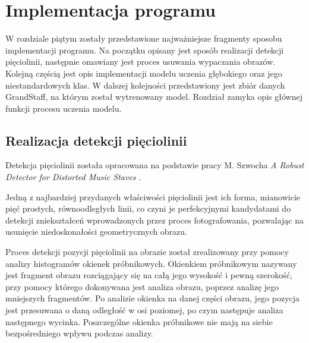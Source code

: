 \chapter{Implementacja programu}
W rozdziale piątym zostały przedstawione najważniejsze fragmenty sposobu implementacji programu. Na początku opisany jest sposób realizacji detekcji pięciolinii, następnie omawiany jest proces usuwania wypaczania obrazów. Kolejną częścią jest opis implementacji modelu uczenia głębokiego oraz jego niestandardowych klas. W dalszej kolejności przedstawiony jest zbiór danych GrandStaff, na którym został wytrenowany model. Rozdział zamyka opis głównej funkcji procesu uczenia modelu.

\section{Realizacja detekcji pięciolinii}

Detekcja pięciolinii została opracowana na podstawie pracy M. Szwocha \textit{A Robust Detector for Distorted Music Staves} \cite{Szwoch2005}.

Jedną z najbardziej przydanych właściwości pięciolinii jest ich forma, mianowicie pięć prostych, równoodległych linii, co czyni je perfekcyjnymi kandydatami do detekcji zniekształceń wprowadzonych przez proces fotografowania, pozwalając na usunięcie niedoskonałości geometrycznych obrazu.

Proces detekcji pozycji pięciolinii na obrazie został zrealizowany przy pomocy analizy histogramów okienek próbnikowych. Okienkiem próbnikowym nazywany jest fragment obrazu rozciągający się na całą jego wysokość i pewną szerokość, przy pomocy którego dokonywana jest analiza obrazu, poprzez analizę jego mniejszych fragmentów. Po analizie okienka na danej części obrazu, jego pozycja jest przesuwana o daną odległość w osi poziomej, po czym następuje analiza następnego wycinka. Poszczególne okienka próbnikowe nie mają na siebie bezpośredniego wpływu podczas analizy.

